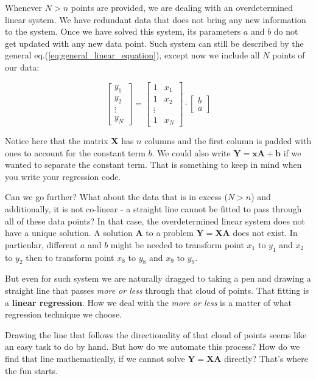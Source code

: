 \documentclass[10pt,twocolumn]{article}
\begin{document}
Whenever $N > n$ points are provided, we are dealing with an overdetermined linear system. We have redundant data that does not bring any new information to the system.
Once we have solved this system, its parameters $a$ and $b$ do not get updated with any new data point. Such system can still be described by the general eq.(\ref{eq:general_linear_equation}), except now we include all $N$ points of our data:

\begin{equation}
\begin{bmatrix}
y_1 \\
y_2 \\
\vdots \\
y_N
\end{bmatrix}
=
\begin{bmatrix}
1 & x_1 \\
1 & x_2 \\
\vdots \\
1 & x_N
\end{bmatrix}
\cdot
\begin{bmatrix}
b \\
a
\end{bmatrix}
\end{equation}

Notice here that the matrix $\bm{X}$ has $n$ columns and the first column is padded with ones to account for the constant term $b$. We could also write $\bm{Y} = \bm{x} \bm{A} + \bm{b}$ if we wanted to separate the constant term. That is something to keep in mind when you write your regression code.

Can we go further? What about the data that is in excess ($N > n$) and additionally, it is not co-linear - a straight line cannot be fitted to pass through all of these data points? In that case, the overdetermined linear system does not have a unique solution. A solution $\bm{A}$ to a problem $\bm{Y} = \bm{X}\bm{A}$ does not exist. In particular, different $a$ and $b$ might be needed to transform point $x_1$ to $y_1$ and $x_2$ to $y_2$ then to transform point $x_8$ to $y_8$ and $x_9$ to $y_9$.

But even for such system we are naturally dragged to taking a pen and drawing a straight line that passes \textit{more or less} through that cloud of points. That fitting is a \textbf{linear regression}. How we deal with the \textit{more or less} is a matter of what regression technique we choose.

Drawing the line that follows the directionality of that cloud of points seems like an easy task to do by hand. But how do we automate this process? How do we find that line mathematically, if we cannot solve $\bm{Y} = \bm{X}\bm{A}$ directly? That's where the fun starts.
\end{document}
